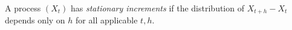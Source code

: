 
A process $(X_t)$ has \emph{stationary increments} if the distribution of $X_{t+h}-X_t$ depends only on $h$ for all applicable $t,h$.
